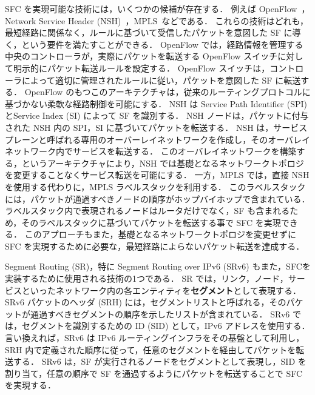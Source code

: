 SFC を実現可能な技術には，いくつかの候補が存在する．
例えば OpenFlow~\cite{openflow}，Network Service Header (NSH)~\cite{rfc8300}，MPLS~\cite{rfc8595}などである．
これらの技術はどれも，最短経路に関係なく，ルールに基づいて受信したパケットを意図した SF に導く，という要件を満たすことができる．
OpenFlow では，経路情報を管理する中央のコントローラが，実際にパケットを転送する OpenFlow スイッチに対して明示的にパケット転送ルールを設定する．
OpenFlow スイッチは，コントローラによって適切に管理されたルールに従い，パケットを意図した SF に転送する．
OpenFlow のもつこのアーキテクチャは，従来のルーティングプロトコルに基づかない柔軟な経路制御を可能にする．
NSH は Service Path Identifier (SPI) とService Index (SI) によって SF を識別する．
NSH ノードは，パケットに付与された NSH 内の SPI，SI に基づいてパケットを転送する．
NSH は，サービスプレーンと呼ばれる専用のオーバーレイネットワークを作成し，そのオーバレイネットワーク内でサービスを転送する．
このオーバレイネットワークを構築する，というアーキテクチャにより，NSH では基礎となるネットワークトポロジを変更することなくサービス転送を可能にする．
一方，MPLS では，直接 NSH を使用する代わりに，MPLS ラベルスタックを利用する．
このラベルスタックには，パケットが通過すべきノードの順序がホップバイホップで含まれている．
ラベルスタック内で表現されるノードはルータだけでなく，SF も含まれるため，そのラベルスタックに基づいてパケットを転送する事で SFC を実現できる．
このアプローチもまた，基礎となるネットワークトポロジを変更せずに SFC を実現するために必要な，最短経路によらないパケット転送を達成する．

Segment Routing (SR)，特に Segment Routing over IPv6 (SRv6) もまた，SFCを実装するために使用される技術の1つである．
SR では，リンク，ノード，サービスといったネットワーク内の各エンティティを\textbf{セグメント}として表現する．
SRv6 パケットのヘッダ (SRH) には，セグメントリストと呼ばれる，そのパケットが通過すべきセグメントの順序を示したリストが含まれている．
SRv6 では，セグメントを識別するための ID (SID) として，IPv6 アドレスを使用する．
言い換えれば，SRv6 は IPv6 ルーティングインフラをその基盤として利用し，SRH 内で定義された順序に従って，任意のセグメントを経由してパケットを転送する．
SRv6 は，SF が実行されるノードをセグメントとして表現し，SID を割り当て，任意の順序で SF を通過するようにパケットを転送することで SFC を実現する．

